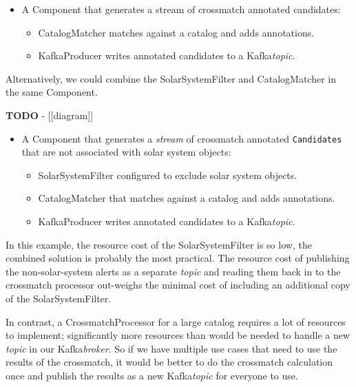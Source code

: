 \documentclass{article}
\newcommand{\kafka} {Kafka\xspace}
\newcommand{\kftopic} {\textit{topic}\xspace}
\newcommand{\kfstream} {\textit{stream}\xspace}
\newcommand{\kfbroker} {\textit{broker}\xspace}
\newcommand{\crossmatch} {crossmatch\xspace}
\newcommand{\javaname}[1] {{\ttfamily\color{codeblue} #1}}
\begin{document}
\begin{itemize}
    \item A \javaname{Component} that generates a stream of \crossmatch annotated candidates:
    \begin{itemize}
        \item \javaname{CatalogMatcher} matches against a catalog and adds annotations.
    \end{itemize}
    \begin{itemize}
        \item \javaname{KafkaProducer} writes annotated candidates to a \kafka \kftopic.
    \end{itemize}
\end{itemize}

Alternatively, we could combine the \javaname{SolarSystemFilter} and \javaname{CatalogMatcher} in the same \javaname{Component}.

\textbf{TODO} - [[diagram]]

\begin{itemize}
    \item A \javaname{Component} that generates a \kfstream of \crossmatch annotated \texttt{Candidates} that are not associated with solar system objects:
    \begin{itemize}
        \item \javaname{SolarSystemFilter} configured to exclude solar system objects.
    \end{itemize}
    \begin{itemize}
        \item \javaname{CatalogMatcher} that matches against a catalog and adds annotations.
    \end{itemize}
    \begin{itemize}
        \item \javaname{KafkaProducer} writes annotated candidates to a \kafka \kftopic.
    \end{itemize}
\end{itemize}

In this example, the resource cost of the \javaname{SolarSystemFilter} is so low, the combined solution is probably the most practical. The resource cost of publishing the non-solar-system alerts as a separate \kftopic and reading them back in to the \crossmatch processor out-weighs the minimal cost of including an additional copy of the \javaname{SolarSystemFilter}.

In contrast, a \javaname{CrossmatchProcessor} for a large catalog requires a lot of resources to implement; significantly more resources than would be needed to handle a new \kftopic in our \kafka \kfbroker. So if we have multiple use cases that need to use the results of the \crossmatch, it would be better to do the \crossmatch calculation once and publish the results as a new \kafka \kftopic for everyone to use.
\end{document}
